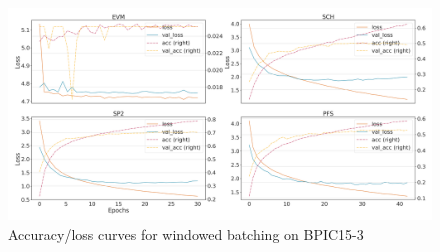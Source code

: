 \begin{figure}[!htb]
    \centering
    \includegraphics[width=\textwidth]{gfx/bpic2015_3/windowed_loss_acc_curve.png}
    \caption{Accuracy/loss curves for windowed batching on BPIC15-3}
\end{figure}
\FloatBarrier

